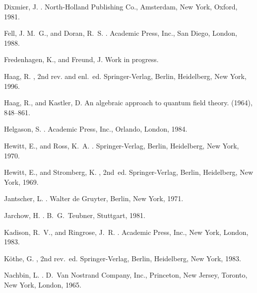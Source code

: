 \documentclass[a4paper,a4paper]{article}
\numberwithin{equation}{section}
\theoremstyle{definition}
\theoremstyle{plain}
\theoremstyle{remark}
\begin{document}
\begin{thebibliography}{10}
{\sc Dixmier, J.}
.
\newblock North-Holland Publishing Co., Amsterdam, New York, Oxford, 1981.

{\sc Fell, J. M.~G., and Doran, R.~S.}
.
\newblock Academic Press, Inc., San Diego, London, 1988.

{\sc Fredenhagen, K., and Freund, J.}
\newblock Work in progress.

{\sc Haag, R.}
, 2nd rev. and enl.~ed.
\newblock Springer-Verlag, Berlin, Heidelberg, New York, 1996.

{\sc Haag, R., and Kastler, D.}
\newblock An algebraic approach to quantum field theory.
 (1964), 848--861.

{\sc Helgason, S.}
.
\newblock Academic Press, Inc., Orlando, London, 1984.

{\sc Hewitt, E., and Ross, K.~A.}
.
\newblock Springer-Verlag, Berlin, Heidelberg, New York, 1970.

{\sc Hewitt, E., and Stromberg, K.}
, 2nd~ed.
\newblock Springer-Verlag, Berlin, Heidelberg, New York, 1969.

{\sc Jantscher, L.}
.
\newblock Walter de Gruyter, Berlin, New York, 1971.

{\sc Jarchow, H.}
.
\newblock B.~G.~Teubner, Stuttgart, 1981.

{\sc Kadison, R.~V., and Ringrose, J.~R.}
.
\newblock Academic Press, Inc., New York, London, 1983.

{\sc K\"othe, G.}
, 2nd rev.~ed.
\newblock Springer-Verlag, Berlin, Heidelberg, New York, 1983.

{\sc Nachbin, L.}
.
\newblock D.~Van Nostrand Company, Inc., Princeton, New Jersey, Toronto, New
  York, London, 1965.


\end{thebibliography}
\end{document}
